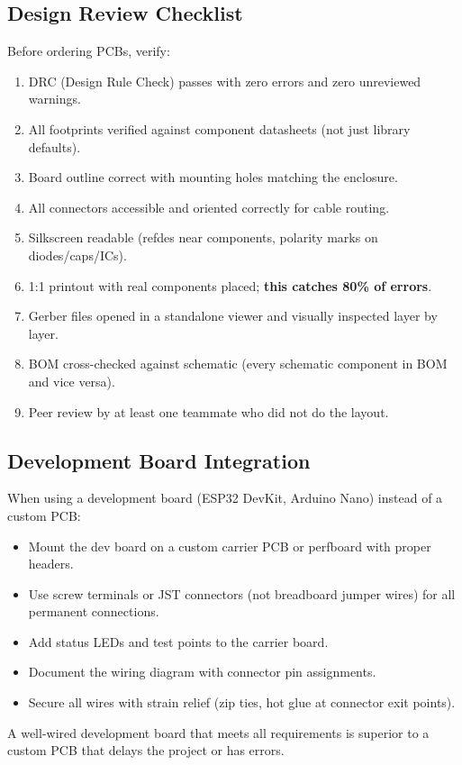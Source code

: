 \subsection{Design Review Checklist}
Before ordering PCBs, verify:
\begin{enumerate}[nosep,leftmargin=1.5em]
\item DRC (Design Rule Check) passes with zero errors and zero unreviewed warnings.
\item All footprints verified against component datasheets (not just library defaults).
\item Board outline correct with mounting holes matching the enclosure.
\item All connectors accessible and oriented correctly for cable routing.
\item Silkscreen readable (refdes near components, polarity marks on diodes/caps/ICs).
\item 1:1 printout with real components placed; \textbf{this catches 80\% of errors}.
\item Gerber files opened in a standalone viewer and visually inspected layer by layer.
\item BOM cross-checked against schematic (every schematic component in BOM and vice versa).
\item Peer review by at least one teammate who did not do the layout.
\end{enumerate}

\subsection{Development Board Integration}
When using a development board (ESP32 DevKit, Arduino Nano) instead of a custom PCB:
\begin{itemize}[nosep,leftmargin=1.5em]
\item Mount the dev board on a custom carrier PCB or perfboard with proper headers.
\item Use screw terminals or JST connectors (not breadboard jumper wires) for all permanent connections.
\item Add status LEDs and test points to the carrier board.
\item Document the wiring diagram with connector pin assignments.
\item Secure all wires with strain relief (zip ties, hot glue at connector exit points).
\end{itemize}
A well-wired development board that meets all requirements is superior to a custom PCB that delays the project or has errors.



